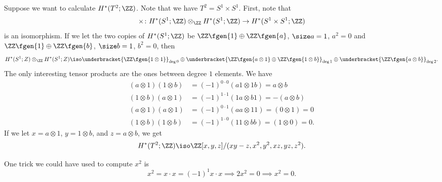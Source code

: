 \documentclass{standalone}
\begin{document}
\begin{example}
  Suppose we want to calculate \(H^*(T^2; \ZZ)\).
  Note that we have \(T^2 = S^1 \times S^1\).
  First, note that
  \[
    \times \colon H^*(S^1; \ZZ) \otimes_\ZZ H^*(S^1; \ZZ) \to
                  H^*(S^1 \times S^1; \ZZ)
  \]
  is an isomorphism.
  If we let the two copies of \(H^*(S^1; \ZZ)\) be
    \(\ZZ\fgen{1} \oplus \ZZ\fgen{a}\), \(\size a = 1\), \(a^2 = 0\) and
    \(\ZZ\fgen{1} \oplus \ZZ\fgen{b}\), \(\size b = 1\), \(b^2 = 0\),
  then
  \[
    H^*(S^1; Z) \otimes_\ZZ H^*(S^1; Z)
      \iso \underbracket{\ZZ\fgen{1 \otimes 1}}_{\deg 0} \oplus
           \underbracket{\ZZ\fgen{a \otimes 1} \oplus
                         \ZZ\fgen{1 \otimes b}}_{\deg 1} \oplus
           \underbracket{\ZZ\fgen{a \otimes b}}_{\deg 2}.
  \]
  The only interesting tensor products are
  the ones between degree \(1\) elements.
  We have
  \begin{align*}
    (a \otimes 1) (1 \otimes b)
      &= (-1)^{0 \cdot 0} (a 1 \otimes 1 b) = a \otimes b \\
    (1 \otimes b) (a \otimes 1)
      &= (-1)^{1 \cdot 1} (1 a \otimes b 1) = -(a \otimes b) \\
    (a \otimes 1) (a \otimes 1)
      &= (-1)^{0 \cdot 1} (a a \otimes 1 1) = (0 \otimes 1) = 0 \\
    (1 \otimes b) (1 \otimes b)
      &= (-1)^{1 \cdot 0} (1 1 \otimes b b) = (1 \otimes 0) = 0.
  \end{align*}
  If we let \(x = a \otimes 1\), \(y = 1 \otimes b\), and \(z = a \otimes b\),
  we get
  \[
    H^*(T^2; \ZZ) \iso \ZZ[x, y, z]/(xy - z, x^2, y^2, xz, yz, z^2).
  \]

  One trick we could have used to compute \(x^2\) is
  \[
    x^2 = x \cdot x = (-1)^1 x \cdot x \implies 2x^2 = 0 \implies x^2 = 0.
  \]
\end{example}
\end{document}
